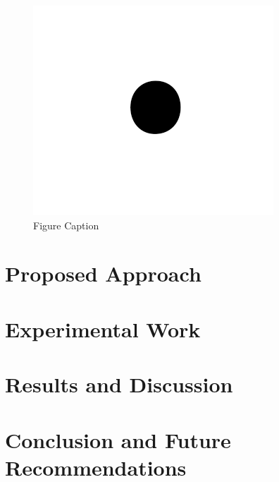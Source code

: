 \documentclass[letterpaper, 10pt, conference]{ieeeconf}
\begin{document}
\begin{figure}[ht]
    \centering
    \includegraphics[width=0.9\linewidth]{fig1.png}
    \caption{Figure Caption}
    \label{fig:figureLabel}
\end{figure}

\section{Proposed Approach}
\label{sec:ProposedApproach}



\section{Experimental Work}
\label{sec:ExperimentalWork}




\section{Results and Discussion}
\label{sec:ResultsAndDiscussion}




\section{Conclusion and Future Recommendations}
\label{sec:Conclusion}





\end{document}

